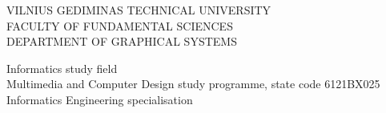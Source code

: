 \begin{center}
{\fontsize{11}{11}\scshape VILNIUS GEDIMINAS TECHNICAL UNIVERSITY}\\
{\fontsize{11}{11}\scshape FACULTY OF FUNDAMENTAL SCIENCES}\\
{\fontsize{11}{11}\scshape DEPARTMENT OF GRAPHICAL SYSTEMS}\\[2.0\baselineskip]
\end{center}
%
\noindent
\begin{minipage}[t]{0.9\textwidth}
    {\fontsize{10}{10} Informatics study field}\\
    {\fontsize{10}{10} Multimedia and Computer Design study programme, state code 6121BX025}\\
    {\fontsize{10}{10} Informatics Engineering specialisation}
\end{minipage}
\vspace{2cm}

